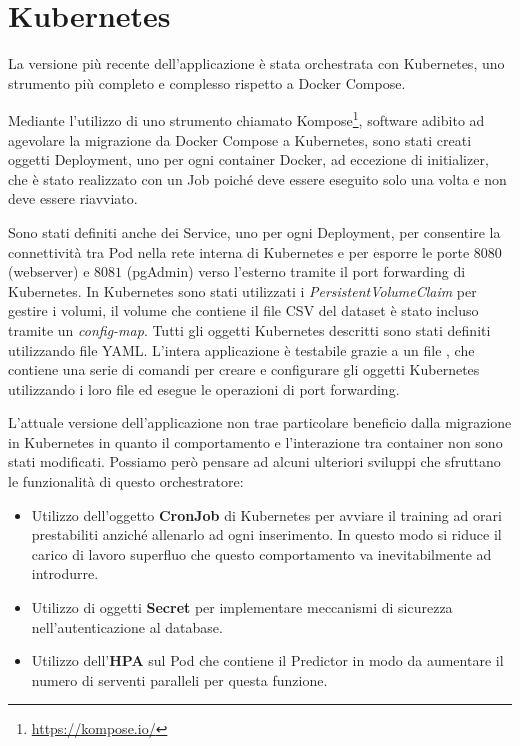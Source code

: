 \documentclass[12pt,a4paper]{report}
\begin{document}
\section{Kubernetes}

La versione più recente dell'applicazione è stata orchestrata con
Kubernetes, uno strumento più completo e complesso
rispetto a Docker Compose. 

Mediante l'utilizzo di uno strumento chiamato
Kompose\footnote[2]{\url{https://kompose.io/}},
software adibito ad agevolare la migrazione da Docker Compose a Kubernetes,
sono stati creati oggetti Deployment,
uno per ogni container Docker, ad eccezione di initializer,
che è stato realizzato con un Job poiché deve essere eseguito
solo una volta e non deve essere riavviato.

Sono stati definiti anche dei Service,
uno per ogni Deployment, per consentire
la connettività tra Pod nella rete interna di Kubernetes
e per esporre le porte $8080$ (webserver)
e $8081$ (pgAdmin) verso l'esterno
tramite il port forwarding di Kubernetes.
In Kubernetes sono stati utilizzati i \emph{PersistentVolumeClaim}
per gestire i volumi,
il volume che contiene il file CSV del dataset è stato incluso tramite
un \emph{config-map}.
Tutti gli oggetti Kubernetes descritti sono stati definiti
utilizzando file YAML.
L'intera applicazione è testabile grazie a un file ,
che contiene una serie di comandi per creare e configurare gli
oggetti Kubernetes utilizzando i loro file
ed esegue le operazioni di port forwarding.

L'attuale versione dell'applicazione non trae particolare
beneficio dalla migrazione in Kubernetes
in quanto il comportamento e l'interazione
tra container non sono stati modificati.
Possiamo però pensare ad alcuni
ulteriori sviluppi che sfruttano le funzionalità
di questo orchestratore:
\begin{itemize}
  \item Utilizzo dell'oggetto \textbf{CronJob} di Kubernetes
  per avviare il training ad orari prestabiliti
  anziché allenarlo ad ogni inserimento.
  In questo modo si riduce il carico di lavoro superfluo
  che questo comportamento va inevitabilmente ad introdurre.
  \item Utilizzo di oggetti \textbf{Secret} per implementare meccanismi di
  sicurezza nell'autenticazione al database.
  \item Utilizzo dell'\textbf{HPA} sul Pod che contiene il Predictor
  in modo da aumentare il numero di serventi paralleli per questa funzione.
\end{itemize}




\cleardoublepage{} %
\end{document}
